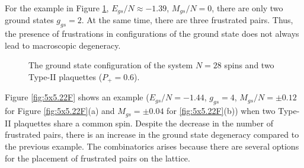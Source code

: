 \documentclass[preprint,12pt]{elsarticle}
\begin{document}
\begin{figure}[H]
	\end{figure}
	
	For the example in Figure \ref{fig:4x7}, $E_{gs}/N \approx -1.39$, $M_{gs}/N=0$, there are only two ground states $g_{gs}=2$. At the same time, there are three frustrated pairs. Thus, the presence of frustrations in configurations of the ground state does not always lead to macroscopic degeneracy. 
	
	\begin{figure}[H]
		\centering
		\caption{The ground state configuration of the system $N=28$ spins and two Type-II plaquettes ($P_+=0.6$).}
		\label{fig:4x7}
	\end{figure}
	
	Figure \ref{fig:5x5.22F} shows an example ($E_{gs}/N=-1.44$, $g_{gs}=4$, $M_{gs}/N=\pm 0.12$ for Figure \ref{fig:5x5.22F}(a) and $M_{gs}=\pm 0.04$ for \ref{fig:5x5.22F}(b)) when two Type-II plaquettes share a common spin. Despite the decrease in the number of frustrated pairs, there is an increase in the ground state degeneracy compared to the previous example. The combinatorics arises because there are several options for the placement of frustrated pairs on the lattice.
	
\end{document}
